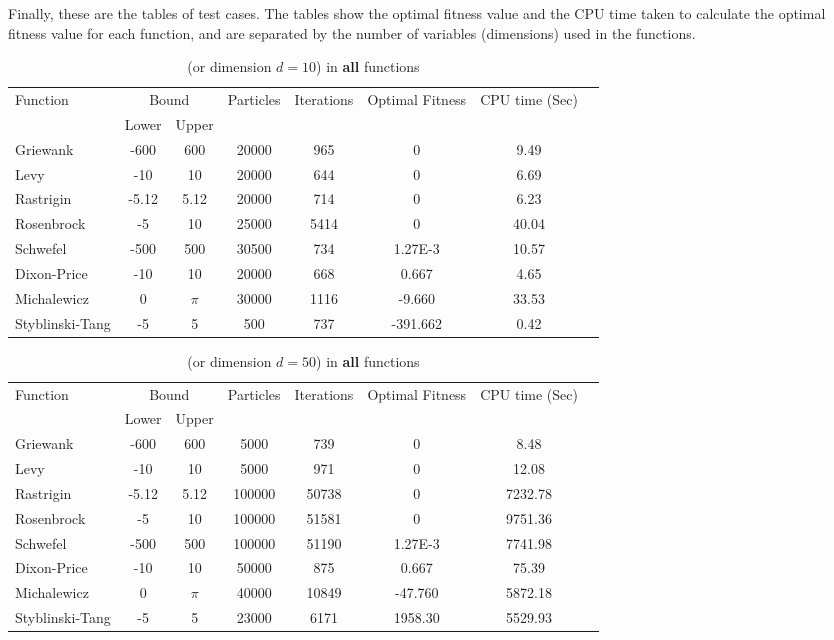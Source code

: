 \documentclass[12pt]{article}
\begin{document}
	Finally, these are the tables of test cases. The tables show the optimal fitness value and the CPU time taken to calculate the optimal fitness value for each function, and are separated by the number of variables (dimensions) used in the functions.
	
	\begin{table}[H]
		\caption{ (or dimension $d=10$) in \textbf{all} functions}
		\label{table:1}
		\centering
		\begin{tabular}{l c c c c c c c}
			\hline
			Function &  \multicolumn{2}{c}{Bound} & Particles & Iterations &  Optimal Fitness & CPU time (Sec) \\
			& Lower& Upper&&&\\
			\hline
			Griewank  		&  -600   & 600 	&20000 &965  &0  &9.49 &\\
			Levy 	  		&  -10    & 10 		&20000 &644 &0 &6.69 &\\
			Rastrigin 		&  -5.12  & 5.12 	&20000 &714 &0 &6.23 &\\
			Rosenbrock		&  -5     & 10 		&25000 &5414 &0 &40.04 &\\
			Schwefel 	 	&  -500   & 500 	&30500 &734 &1.27E-3 &10.57 &\\
			Dixon-Price 	&   -10	  & 10 		&20000 &668 &0.667 &4.65 &\\
			Michalewicz 	&   0 	  & $\pi$ 	&30000 &1116 &-9.660 &33.53 &\\
			Styblinski-Tang & -5 	  & 5  		&500 &737 &-391.662 &0.42 &\\
			\hline
		\end{tabular}
	\end{table}
	
	
	\begin{table}[H]
		\caption{ (or dimension $d=50$) in \textbf{all} functions}
		\label{table:1}
		\centering
		\begin{tabular}{l c c c c c c c}
			\hline
			Function &  \multicolumn{2}{c}{Bound} & Particles & Iterations &  Optimal Fitness & CPU time (Sec) \\
			& Lower& Upper&&&\\
			\hline
			Griewank  		&  -600   & 600 	&5000 &739 &0 &8.48 &\\
			Levy 	  		&  -10    & 10 		&5000 &971 &0 &12.08 &\\
			Rastrigin 		&  -5.12  & 5.12 	&100000 &50738 &0 &7232.78 &\\
			Rosenbrock		&  -5     & 10 		&100000 &51581 &0 &9751.36 &\\
			Schwefel 	 	&  -500   & 500 	&100000 &51190 &1.27E-3 &7741.98 &\\
			Dixon-Price 	&   -10	  & 10 		&50000 &875 &0.667 &75.39 &\\
			Michalewicz 	&   0 	  & $\pi$ 	&40000 &10849 &-47.760 &5872.18 &\\
			Styblinski-Tang & -5 	  & 5  		&23000 &6171 &1958.30 &5529.93 &\\
			\hline
		\end{tabular}
	\end{table}
	
\end{document}
